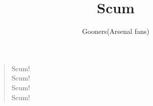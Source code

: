 \documentclass[a4paper,12pt]{article}
\title{Scum}
\author{Gooners(Arsenal fans)}
\date{}
\begin{document}
	
	\maketitle
	
	\begin{verse}
		
		Scum! \\
		Scum! \\
		Scum! \\
		Scum!
		
	\end{verse}
	
\end{document}
